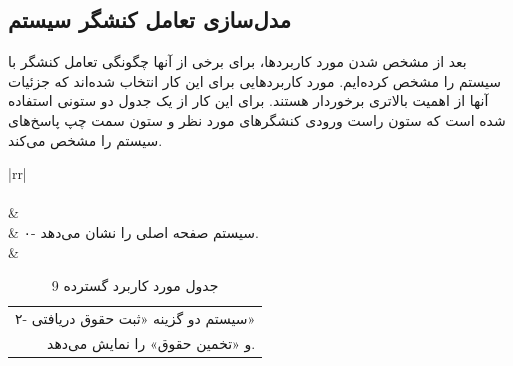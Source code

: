 \documentclass[12pt]{article}
\begin{document}
	\subsection{مدل‌سازی تعامل کنشگر سیستم}
	بعد از مشخص شدن مورد کاربردها، برای برخی از آنها چگونگی تعامل کنشگر با سیستم را مشخص کرده‌ایم. مورد کاربردهایی برای این کار انتخاب شده‌اند که جزئیات آنها از اهمیت بالاتری برخوردار هستند.
	برای این کار از یک جدول دو ستونی استفاده شده است که ستون راست ورودی کنشگرهای مورد نظر و ستون سمت چپ پاسخ‌های سیستم را مشخص می‌کند.
\begin{center}
	\begin{table}[H]
		\caption{جدول مورد کاربرد گسترده 9}
		\label{tab:ext-uc9}

		\begin{tabular}{|rr|}
			\hline
			                                                                                                                                                                           \\ \hline
			                                                                                                                                                                                                                                          \\ \hline
			                                                                                            &                                                                                \\ \hline
			                                                                                                                    & ۰-  سیستم صفحه اصلی را نشان می‌دهد.                                                                                           \\ \hline
			      & \begin{tabular}[c]{@{}r@{}}۲- سیستم دو گزینه «ثبت حقوق دریافتی» \\ و «تخمین حقوق» را نمایش می‌دهد.\end{tabular}               \\ \hline

\end{tabular}
\end{table}
\end{center}
\end{document}
